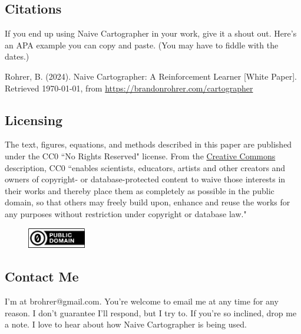 

\subsection{Citations}
\label{subsec:citations}

If you end up using Naive Cartographer in your work, give it a shout out.
Here's an APA example you can copy and paste. (You may have to fiddle with
the dates.)

Rohrer, B. (2024). Naive Cartographer: A Reinforcement Learner [White Paper].
Retrieved \today, from
\href{https://brandonrohrer.com/cartographer}{https://brandonrohrer.com/cartographer}


\subsection{Licensing}
\label{subsec:license}

The text, figures, equations, and methods described in this paper
are published under the CC0 ``No Rights Reserved" license.
From the
\href{https://creativecommons.org/public-domain/cc0/}{Creative Commons} description,
CC0 ``enables scientists, educators,
artists and other creators and owners of copyright- or database-protected
content to waive those interests in their works and thereby place them as
completely as possible in the public domain, so that others may freely
build upon, enhance and reuse the works for any purposes without restriction
under copyright or database law."

\begin{figure}[ht]
\vskip 0.2in
\begin{center}
\centerline{\includegraphics[width=1.0in]{images/cc-zero.png}}
\label{fig:cc0}
\end{center}
\vskip -0.2in
\end{figure}

\subsection{Contact Me}
\label{subsec:contact}

I'm at brohrer@gmail.com. You're welcome to email me at any time for
any reason. I don't guarantee I'll respond, but I try to.
If you're so inclined, drop me a note.
I love to hear about how
Naive Cartographer is being used.
